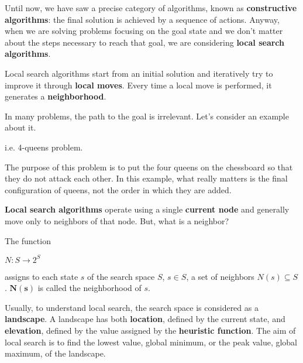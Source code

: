 Until now, we have saw a precise category of algorithms, known as \textbf{constructive algorithms}: the final solution is achieved by a sequence of actions. Anyway, when we
are solving problems focusing on the goal state and we don't matter about the steps necessary to reach that goal, we are considering \textbf{local search algorithms}. \vspace{3.5pt}

Local search algorithms start from an initial solution and iteratively try to improve it through \textbf{local moves}. Every time a local move is performed, it generates a 
\textbf{neighborhood}. \vspace{3.5pt}

In many problems, the path to the goal is irrelevant. Let's consider an example about it.
\begin{example}
    i.e. 4-queens problem. \vspace{3.5pt}
    \begin{center}
    \end{center} \vspace{3.5pt}

    The purpose of this problem is to put the four queens on the chessboard so that they do not attack each other. In this example, what really matters is the final
    configuration of queens, not the order in which they are added.
\end{example}

\textbf{Local search algorithms} operate using a single \textbf{current node} and generally move only to neighbors of that node. But, what is a neighbor?
\begin{definition}
    The function \vspace{3.5pt}
    \begin{center}
        $N: S \rightarrow 2^S$
    \end{center} \vspace{3.5pt}

    assigns to each state $s$ of the search space $S$, $s \in S$, a set of neighbors $N(s) \subseteq S$. $\mathbf{N(s)}$ is called the neighborhood of $s$.
\end{definition}

Usually, to understand local search, the search space is considered as a \textbf{landscape}. A landscape has both \textbf{location}, defined by the current state, 
and \textbf{elevation}, defined by the value assigned by the \textbf{heuristic function}. The aim of local search is to find the lowest value, global minimum, or the peak
value, global maximum, of the landscape. \vspace{3.5pt}
\begin{center}
\end{center} \vspace{3.5pt}